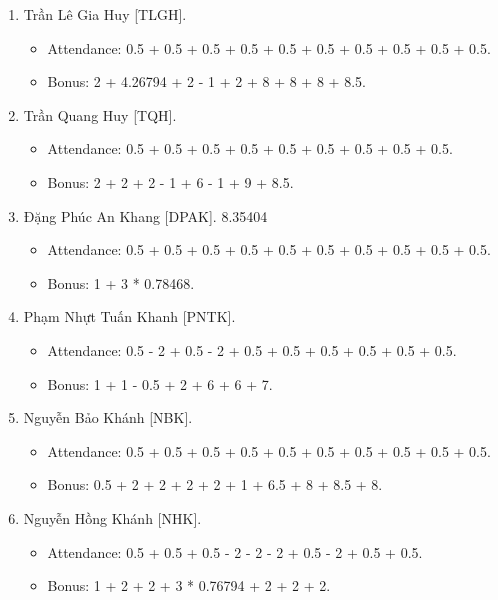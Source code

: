 \documentclass{article}
\begin{document}
\begin{enumerate}
\begin{itemize}
        \item Bonus: 1 + 2 + 3.84687 + 2 + 2 + 10 + 9 + 9.
    \end{itemize}
    \item {\sc Trần Lê Gia Huy [TLGH].}
    \begin{itemize}
        \item Attendance: 0.5 + 0.5 + 0.5 + 0.5 + 0.5 + 0.5 + 0.5 + 0.5 + 0.5 + 0.5.
        \item Bonus: 2 + 4.26794 + 2 - 1 + 2 + 8 + 8 + 8 + 8.5.
    \end{itemize}
    \item {\sc Trần Quang Huy [TQH].}
    \begin{itemize}
        \item Attendance: 0.5 + 0.5 + 0.5 + 0.5 + 0.5 + 0.5 + 0.5 + 0.5 + 0.5.
        \item Bonus: 2 + 2 + 2 - 1 + 6 - 1 + 9 + 8.5.
    \end{itemize}
    \item {\sc Đặng Phúc An Khang [DPAK].} 8.35404
    \begin{itemize}
        \item Attendance: 0.5 + 0.5 + 0.5 + 0.5 + 0.5 + 0.5 + 0.5 + 0.5 + 0.5 + 0.5.
        \item Bonus: 1 + 3 * 0.78468.
    \end{itemize}
    \item {\sc Phạm Nhựt Tuấn Khanh [PNTK].}
    \begin{itemize}
        \item Attendance: 0.5 - 2 + 0.5 - 2 + 0.5 + 0.5 + 0.5 + 0.5 + 0.5 + 0.5.
        \item Bonus: 1 + 1 - 0.5 + 2 + 6 + 6 + 7.
    \end{itemize}
    \item {\sc Nguyễn Bảo Khánh [NBK].}
    \begin{itemize}
        \item Attendance: 0.5 + 0.5 + 0.5 + 0.5 + 0.5 + 0.5 + 0.5 + 0.5 + 0.5 + 0.5.
        \item Bonus: 0.5 + 2 + 2 + 2 + 2 + 1 + 6.5 + 8 + 8.5 + 8.
    \end{itemize}
    \item {\sc Nguyễn Hồng Khánh [NHK].}
    \begin{itemize}
        \item Attendance: 0.5 + 0.5 + 0.5 - 2 - 2 - 2 + 0.5 - 2 + 0.5 + 0.5.
        \item Bonus: 1 + 2 + 2 + 3 * 0.76794 + 2 + 2 + 2.

\end{itemize}
\end{enumerate}
\end{document}
